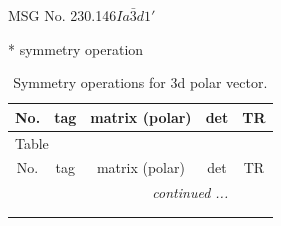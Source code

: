 \documentclass[fleqn,8pt]{jsarticle}
\begin{document}
\setcounter{MaxMatrixCols}{32}

\renewcommand{\tablename}{Table~}
\renewcommand{\figurename}{Figure~}
\begin{center}
\LARGE
MSG No. 230.146\quad$Ia\bar{3}d1'$
\end{center}
* symmetry operation
\renewcommand{\arraystretch}{1.3}
\begin{longtable}{ccccc}
\caption{Symmetry operations for 3d polar vector.}
 \\
 \hline \hline
No. & tag & matrix (polar) & det & TR \\ \hline \endfirsthead

\multicolumn{4}{l}{\tablename\ \thetable{}} \\
 \hline \hline
No. & tag & matrix (polar) & det & TR \\ \hline \endhead

 \hline \hline
\multicolumn{4}{r}{\footnotesize\it continued ...} \\ \endfoot

 \hline \hline
\multicolumn{4}{r}{} \\ \endlastfoot


\end{longtable}
\end{document}
